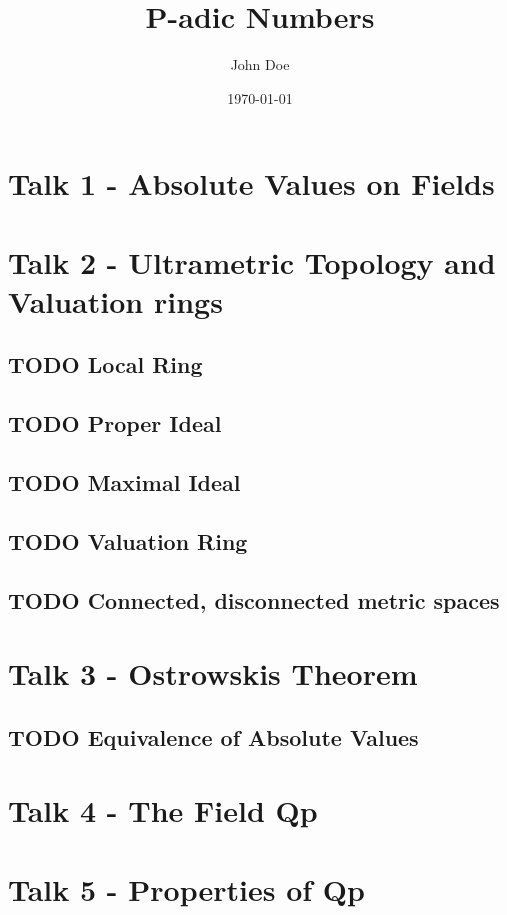 \documentclass[11pt]{article}
\author{John Doe}
\date{\today}
\title{P-adic Numbers}
\begin{document}
\maketitle
\tableofcontents

\section{Talk 1 - Absolute Values on Fields}
\label{sec:org860adfe}
\section{Talk 2 - Ultrametric Topology and Valuation rings}
\label{sec:orga4ad29f}
\subsection{{\bfseries\sffamily TODO} Local Ring}
\label{sec:orgf2629ad}
\subsection{{\bfseries\sffamily TODO} Proper Ideal}
\label{sec:orga422ec5}
\subsection{{\bfseries\sffamily TODO} Maximal Ideal}
\label{sec:orgb0d6cb4}
\subsection{{\bfseries\sffamily TODO} Valuation Ring}
\label{sec:org2b9e2ac}
\subsection{{\bfseries\sffamily TODO} Connected, disconnected metric spaces}
\label{sec:org8390511}
\section{Talk 3 - Ostrowskis Theorem}
\label{sec:orgfccdefb}
\subsection{{\bfseries\sffamily TODO} Equivalence of Absolute Values}
\label{sec:orga4169eb}
\section{Talk 4 - The Field Qp}
\label{sec:orgfbc55ff}
\section{Talk 5 - Properties of Qp}
\label{sec:org0d66125}
\end{document}
